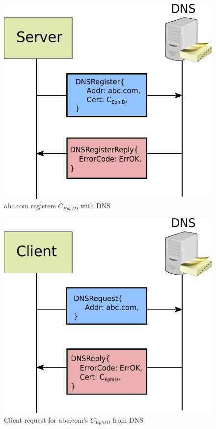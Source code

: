 \begin{figure}[th]
\centering
\includegraphics[scale=0.6]{Figures/dns_register.pdf}
\decoRule
\caption[DNS Register Domain]{abc.com registers $C_{EphID}$ with DNS}
\label{fig:dns_register}
\end{figure}

\begin{figure}[th!]
\centering
\includegraphics[scale=0.6]{Figures/dns_request.pdf}
\decoRule
\caption[DNS Request for a Domain]{Client request for abc.com's $C_{EphID}$ from DNS}
\label{fig:dns_request}
\end{figure}

